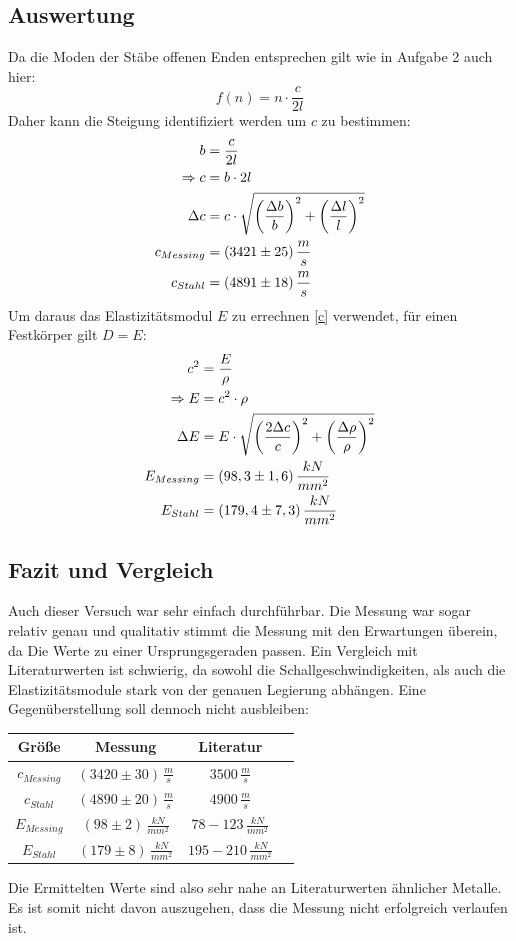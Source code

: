 \subsection{Auswertung}
Da die Moden der Stäbe offenen Enden entsprechen gilt wie in Aufgabe 2 auch hier:
\begin{equation}
f(n) = n \cdot \frac{c}{2l}
\end{equation}
Daher kann die Steigung identifiziert werden um \(c\) zu bestimmen:
\begin{align}
b &= \frac{c}{2l}\\
\Rightarrow c &= b \cdot 2l\\
\Delta c &= c \cdot \sqrt{\left( \frac{\Delta b}{b} \right)^2+ \left( \frac{\Delta l}{l} \right)^2}\\
c_{Messing} &= (3421 \pm 25)\, \frac{m}{s} \notag \\
c_{Stahl} &=  (4891 \pm 18)\, \frac{m}{s} \notag
\end{align}
Um daraus das Elastizitätsmodul \(E\) zu errechnen \eqref{c} verwendet, für einen Festkörper gilt \(D = E\):
\begin{align}
c^2 &= \frac{E}{\rho} \\
\Rightarrow E &= c^2 \cdot \rho \\
\Delta E &= E \cdot \sqrt{\left(\frac{2\Delta c}{c}\right)^2+\left(\frac{\Delta \rho}{\rho}\right)^2 }\\
E_{Messing} &= (98,3 \pm 1,6) \, \frac{kN}{mm^2} \notag \\
E_{Stahl} &= (179,4 \pm 7,3) \, \frac{kN}{mm^2} \notag
\end{align}
\subsection{Fazit und Vergleich}
Auch dieser Versuch war sehr einfach durchführbar. Die Messung war sogar relativ genau und qualitativ stimmt die Messung mit den Erwartungen überein, da Die Werte zu einer Ursprungsgeraden passen. Ein Vergleich mit Literaturwerten ist schwierig, da sowohl die Schallgeschwindigkeiten, als auch die Elastizitätsmodule stark von der genauen Legierung abhängen. Eine Gegenüberstellung soll dennoch nicht ausbleiben:
\begin{center}
\begin{tabular}{c|c|c|c}
Größe & Messung & Literatur\\\hline
\(c_{Messing}\) & \((3420 \pm 30)\, \frac{m}{s}\) & \(3500\, \frac{m}{s}\)\\
\(c_{Stahl}\) & \((4890 \pm 20)\, \frac{m}{s}\) & \(4900\, \frac{m}{s}\)\\
\(E_{Messing}\) & \((98 \pm 2) \, \frac{kN}{mm^2}\) & \(78-123 \, \frac{kN}{mm^2}\) \\
\(E_{Stahl}\) & \((179 \pm 8) \, \frac{kN}{mm^2}\) & \(195-210 \, \frac{kN}{mm^2}\)
\end{tabular}
\end{center}
Die Ermittelten Werte sind also sehr nahe an Literaturwerten ähnlicher Metalle. Es ist somit nicht davon auszugehen, dass die Messung nicht erfolgreich verlaufen ist.
